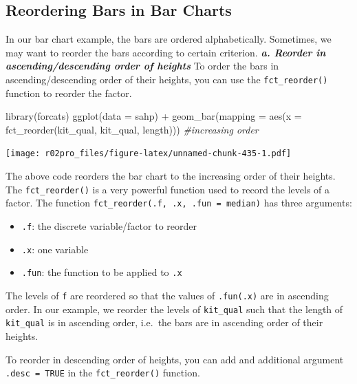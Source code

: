 \documentclass[
]{book}
\newenvironment{Shaded}{\begin{snugshade}}{\end{snugshade}}
\newcommand{\AttributeTok}[1]{\textcolor[rgb]{0.77,0.63,0.00}{#1}}
\newcommand{\CommentTok}[1]{\textcolor[rgb]{0.56,0.35,0.01}{\textit{#1}}}
\newcommand{\FunctionTok}[1]{\textcolor[rgb]{0.00,0.00,0.00}{#1}}
\newcommand{\NormalTok}[1]{#1}
\newcommand{\SpecialCharTok}[1]{\textcolor[rgb]{0.00,0.00,0.00}{#1}}
\providecommand{\tightlist}{%
  \setlength{\itemsep}{0pt}\setlength{\parskip}{0pt}}
\begin{document}
\hypertarget{reordering-bar-chart}{%
\subsection{Reordering Bars in Bar Charts}\label{reordering-bar-chart}}

In our bar chart example, the bars are ordered alphabetically. Sometimes, we may want to reorder the bars according to certain criterion.
\textbf{\emph{a. Reorder in ascending/descending order of heights}}
To order the bars in ascending/descending order of their heights, you can use the \texttt{fct\_reorder()} function to reorder the factor.

\begin{Shaded}
\begin{Highlighting}[]
\FunctionTok{library}\NormalTok{(forcats)}
\FunctionTok{ggplot}\NormalTok{(}\AttributeTok{data =}\NormalTok{ sahp) }\SpecialCharTok{+} \FunctionTok{geom\_bar}\NormalTok{(}\AttributeTok{mapping =} \FunctionTok{aes}\NormalTok{(}\AttributeTok{x =} \FunctionTok{fct\_reorder}\NormalTok{(kit\_qual, kit\_qual, length))) }\CommentTok{\#increasing order}
\end{Highlighting}
\end{Shaded}

\texttt{[image: r02pro\_files/figure-latex/unnamed-chunk-435-1.pdf]}

The above code reorders the bar chart to the increasing order of their heights. The \texttt{fct\_reorder()} is a very powerful function used to record the levels of a factor. The function \texttt{fct\_reorder(.f,\ .x,\ .fun\ =\ median)} has three arguments:

\begin{itemize}
\tightlist
\item
  \texttt{.f}: the discrete variable/factor to reorder
\item
  \texttt{.x}: one variable
\item
  \texttt{.fun}: the function to be applied to \texttt{.x}
\end{itemize}

The levels of \texttt{f} are reordered so that the values of \texttt{.fun(.x)} are in ascending order. In our example, we reorder the levels of \texttt{kit\_qual} such that the length of \texttt{kit\_qual} is in ascending order, i.e.~the bars are in ascending order of their heights.

To reorder in descending order of heights, you can add and additional argument \texttt{.desc\ =\ TRUE} in the \texttt{fct\_reorder()} function.
\end{document}
